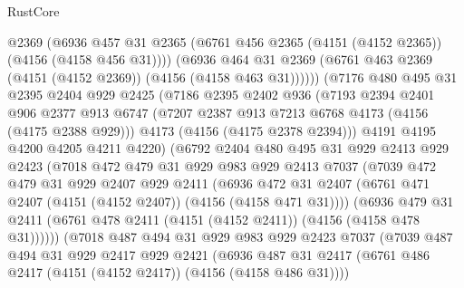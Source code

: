 \begin{lexlean}{RustCore}
\begin{coremodule}
                @2369
                (@6936
                  @457
                  @31
                  @2365
                  (@6761 @456 @2365 (@4151 (@4152 @2365)) (@4156 (@4158 @456 @31))))
                (@6936
                  @464
                  @31
                  @2369
                  (@6761 @463 @2369 (@4151 (@4152 @2369)) (@4156 (@4158 @463 @31))))))
            (@7176
              @480
              @495
              @31
              @2395
              @2404
              @929
              @2425
              (@7186
                @2395
                @2402
                @936
                (@7193
                  @2394
                  @2401
                  @906
                  @2377
                  @913
                  @6747
                  (@7207 @2387 @913 @7213 @6768 @4173 (@4156 (@4175 @2388 @929)))
                  @4173
                  (@4156 (@4175 @2378 @2394)))
                @4191
                @4195
                @4200
                @4205
                @4211
                @4220)
              (@6792
                @2404
                @480
                @495
                @31
                @929
                @2413
                @929
                @2423
                (@7018
                  @472
                  @479
                  @31
                  @929
                  @983
                  @929
                  @2413
                  @7037
                  (@7039
                    @472
                    @479
                    @31
                    @929
                    @2407
                    @929
                    @2411
                    (@6936
                      @472
                      @31
                      @2407
                      (@6761 @471 @2407 (@4151 (@4152 @2407)) (@4156 (@4158 @471 @31))))
                    (@6936
                      @479
                      @31
                      @2411
                      (@6761 @478 @2411 (@4151 (@4152 @2411)) (@4156 (@4158 @478 @31))))))
                (@7018
                  @487
                  @494
                  @31
                  @929
                  @983
                  @929
                  @2423
                  @7037
                  (@7039
                    @487
                    @494
                    @31
                    @929
                    @2417
                    @929
                    @2421
                    (@6936
                      @487
                      @31
                      @2417
                      (@6761 @486 @2417 (@4151 (@4152 @2417)) (@4156 (@4158 @486 @31))))

\end{coremodule}
\end{lexlean}
